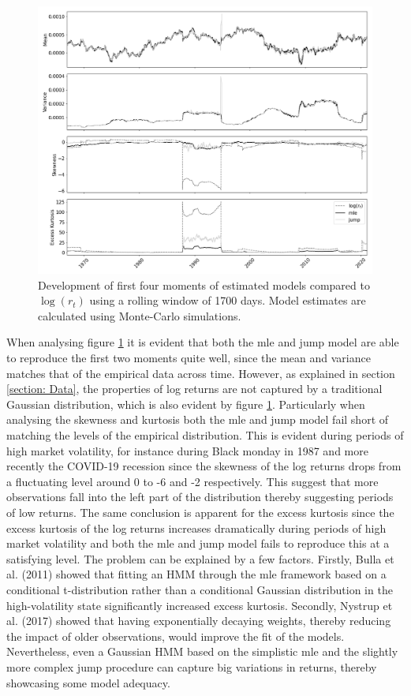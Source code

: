 \begin{figure}[H] 
    \centering
    \includegraphics[width=1.0\textwidth]{analysis/stylized_facts/images/moments.png}
    \caption{Development of first four moments of estimated models compared to $\log(r_t)$ using a rolling window of 1700 days. Model estimates are calculated using Monte-Carlo simulations.}
    \label{fig:stylized_facts_rolling_moments} 
\end{figure}

When analysing figure \ref{fig:stylized_facts_rolling_moments} it is evident that both the mle and jump model are able to reproduce the first two moments quite well, since the mean and variance matches that of the empirical data across time. However, as explained in section \ref{section: Data}, the properties of log returns are not captured by a traditional Gaussian distribution, which is also evident by figure \ref{fig:stylized_facts_rolling_moments}. Particularly when analysing the skewness and kurtosis both the mle and jump model fail short of matching the levels of the empirical distribution. This is evident during periods of high market volatility, for instance during Black monday in 1987 and more recently the COVID-19 recession since the skewness of the log returns drops from a fluctuating level around 0 to -6 and -2 respectively. This suggest that more observations fall into the left part of the distribution thereby suggesting periods of low returns. The same conclusion is apparent for the excess kurtosis since the excess kurtosis of the log returns increases dramatically during periods of high market volatility and both the mle and jump model fails to reproduce this at a satisfying level. The problem can be explained by a few factors. Firstly, Bulla et al. (2011) showed that fitting an HMM through the mle framework based on a conditional t-distribution rather than a conditional Gaussian distribution in the high-volatility state significantly increased excess kurtosis. Secondly, Nystrup et al. (2017) showed that having exponentially decaying weights, thereby reducing the impact of older observations, would improve the fit of the models. Nevertheless, even a Gaussian HMM based on the simplistic mle and the slightly more complex jump procedure can capture big variations in returns, thereby showcasing some model adequacy.


